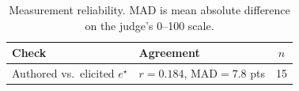 \begin{table}[t]
\centering
\caption{Measurement reliability. MAD is mean absolute difference on the judge's 0--100 scale.}
\label{tab:reliability}
\begin{tabular}{llc}
\toprule
Check & Agreement & $n$ \\
\midrule
Authored vs.\ elicited $e^{\star}$ & $r=0.184$, MAD$=7.8$ pts & 15 \\
\bottomrule
\end{tabular}
\end{table}
